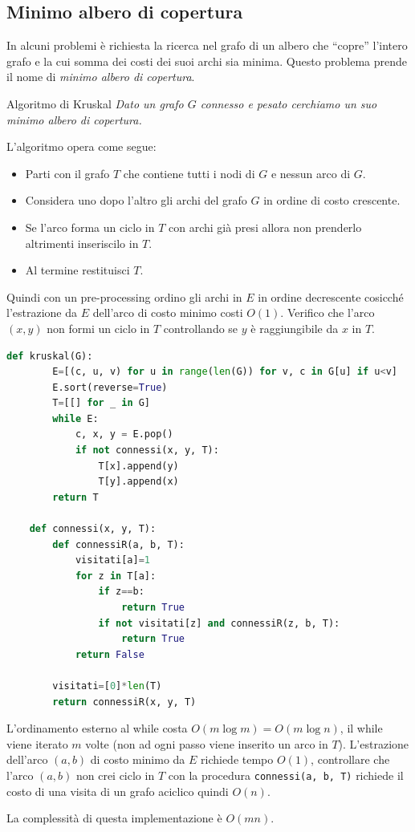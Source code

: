 \subsection{Minimo albero di copertura}
In alcuni problemi è richiesta la ricerca nel grafo di un albero che “copre” l’intero grafo e la cui somma dei costi dei suoi archi sia minima. Questo problema prende il nome di \textit{minimo albero di copertura}.

\begin{Algoritmo}{Algoritmo di Kruskal}{}
    \textit{Dato un grafo $G$ connesso e pesato cerchiamo un suo minimo albero di copertura.}

    L'algoritmo opera come segue:
    \begin{itemize}
        \item Parti con il grafo $T$ che contiene tutti i nodi di $G$ e nessun arco di $G$.
        \item Considera uno dopo l’altro gli archi del grafo $G$ in ordine di costo crescente.
        \item Se l’arco forma un ciclo in $T$ con archi già presi allora non prenderlo altrimenti inseriscilo in $T$.
        \item Al termine restituisci $T$.
    \end{itemize}

    Quindi con un pre-processing ordino gli archi in $E$ in ordine decrescente cosicché l'estrazione da $E$ dell'arco di costo minimo costi $O(1)$. Verifico che l’arco $(x, y)$ non formi un ciclo in $T$ controllando se $y$ è raggiungibile da $x$ in $T$.

    \begin{lstlisting}[language=Python]
    def kruskal(G):
        E=[(c, u, v) for u in range(len(G)) for v, c in G[u] if u<v]
        E.sort(reverse=True)
        T=[[] for _ in G]
        while E:
            c, x, y = E.pop()
            if not connessi(x, y, T):
                T[x].append(y)
                T[y].append(x)
        return T

    def connessi(x, y, T):
        def connessiR(a, b, T):
            visitati[a]=1
            for z in T[a]:
                if z==b:
                    return True
                if not visitati[z] and connessiR(z, b, T):
                    return True
            return False

        visitati=[0]*len(T)
        return connessiR(x, y, T)
    \end{lstlisting}

    L'ordinamento esterno al while costa $O(m \log m) = O(m \log n)$, il while viene iterato $m$ volte (non ad ogni passo viene inserito un arco in $T$). L'estrazione dell'arco $(a, b)$ di costo minimo da $E$ richiede tempo $O(1)$, controllare che l'arco $(a, b)$ non crei ciclo in $T$ con la procedura \verb|connessi(a, b, T)| richiede il costo di una visita di un grafo aciclico quindi $O(n)$.

    La complessità di questa implementazione è $O(mn)$.
\end{Algoritmo}

